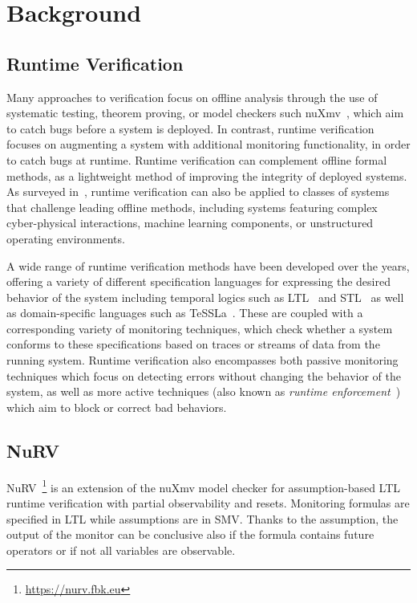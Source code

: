 \section{Background}\label{sec:background}

\subsection{Runtime Verification}

Many approaches to verification focus on offline analysis through the use of systematic testing, theorem proving, or model checkers such nuXmv~\cite{cavada2014nuxmv}, which aim to catch bugs before a system is deployed.
In contrast, runtime verification focuses on augmenting a system with additional monitoring functionality, in order to catch bugs at runtime.
Runtime verification can complement offline formal methods, as a lightweight method of improving the integrity of deployed systems.
As surveyed in~\cite{sanchez2019advancedrvsurvey}, runtime verification can also be applied to classes of systems that challenge leading offline methods, including systems featuring complex cyber-physical interactions, machine learning components, or unstructured operating environments.

A wide range of runtime verification methods have been developed over the years, offering a variety of different specification languages for expressing the desired behavior of the system including temporal logics such as LTL~\cite{pnueli1977ltl} and STL~\cite{donze2013stl} as well as domain-specific languages such as TeSSLa~\cite{convent2018tessla}.
These are coupled with a corresponding variety of monitoring techniques, which check whether a system conforms to these specifications based on traces or streams of data from the running system.
Runtime verification also encompasses both passive monitoring techniques which focus on detecting errors without changing the behavior of the system, as well as more active techniques (also known as \emph{runtime enforcement}~\cite{falcone2010runtimeenforcement}) which aim to block or correct bad behaviors.

\subsection{NuRV}

NuRV~\cite{CimattiTT19a}\footnote{\url{https://nurv.fbk.eu}} is an
extension of the nuXmv model checker for assumption-based LTL runtime
verification with partial observability and resets. Monitoring
formulas are specified in LTL while assumptions are in SMV. Thanks to the
assumption, the output of the monitor can be conclusive also if the
formula contains future operators or if not all variables are
observable.

